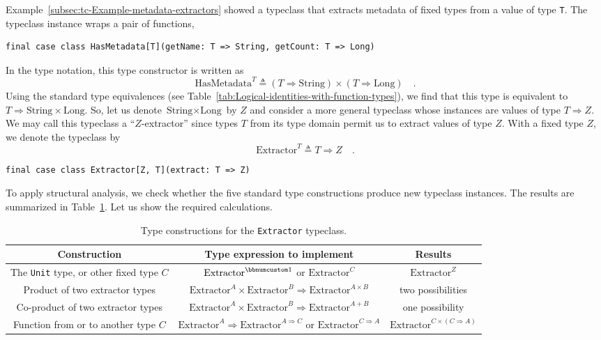 Example~\ref{subsec:tc-Example-metadata-extractors} showed a typeclass
that extracts metadata of fixed types from a value of type \lstinline!T!.
The typeclass instance wraps a pair of functions,
\begin{lstlisting}
final case class HasMetadata[T](getName: T => String, getCount: T => Long)
\end{lstlisting}
In the type notation, this type constructor is written as
\[
\text{HasMetadata}^{T}\triangleq(T\Rightarrow\text{String})\times(T\Rightarrow\text{Long})\quad.
\]
Using the standard type equivalences (see Table~\ref{tab:Logical-identities-with-function-types}),
we find that this type is equivalent to $T\Rightarrow\text{String}\times\text{Long}$.
So, let us denote $\text{String}\times\text{Long}$ by $Z$ and consider
a more general typeclass whose instances are values of type $T\Rightarrow Z$.
We may call this typeclass a ``$Z$-extractor''
since types $T$ from its type domain permit us to extract values
of type $Z$. With a fixed type $Z$, we denote the typeclass by
\[
\text{Extractor}^{T}\triangleq T\Rightarrow Z\quad.
\]
\begin{lstlisting}
final case class Extractor[Z, T](extract: T => Z)
\end{lstlisting}

To apply structural analysis, we check whether the five standard type
constructions produce new typeclass instances. The results are summarized
in Table~\ref{tab:Type-constructions-for-Extractor}. Let us show
the required calculations.

\begin{table}
\begin{centering}
\begin{tabular}{|c|c|c|}
\hline 
\textbf{\footnotesize{}Construction} & \textbf{\footnotesize{}Type expression to implement} & \textbf{\footnotesize{}Results}\tabularnewline
\hline 
\hline 
{\footnotesize{}The }\lstinline!Unit!{\footnotesize{} type, or other
fixed type $C$} & {\footnotesize{}$\text{Extractor}^{\bbnum 1}$ or $\text{Extractor}^{C}$} & {\footnotesize{}$\text{Extractor}^{Z}$}\tabularnewline
\hline 
{\footnotesize{}Product of two extractor types} & {\footnotesize{}$\text{Extractor}^{A}\times\text{Extractor}^{B}\Rightarrow\text{Extractor}^{A\times B}$} & {\footnotesize{}two possibilities}\tabularnewline
\hline 
{\footnotesize{}Co-product of two extractor types} & {\footnotesize{}$\text{Extractor}^{A}\times\text{Extractor}^{B}\Rightarrow\text{Extractor}^{A+B}$} & {\footnotesize{}one possibility}\tabularnewline
\hline 
{\footnotesize{}Function from or to another type $C$} & {\footnotesize{}$\text{Extractor}^{A}\Rightarrow\text{Extractor}^{A\Rightarrow C}$
or $\text{Extractor}^{C\Rightarrow A}$ } & {\footnotesize{}$\text{Extractor}^{C\times\left(C\Rightarrow A\right)}$}\tabularnewline
\hline 
\end{tabular}
\par\end{centering}
\caption{Type constructions for the \lstinline!Extractor! typeclass.\label{tab:Type-constructions-for-Extractor}}
\end{table}


